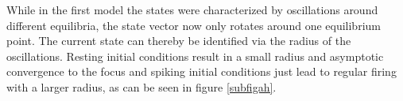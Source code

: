 \documentclass[12pt,a4paper]{article}
\begin{document}
While in the first model the states were characterized by oscillations around different equilibria, the state vector now only rotates around one equilibrium point. The current state can thereby be identified via the radius of the oscillations. Resting initial conditions result in a small radius and asymptotic convergence to the focus and spiking initial conditions just lead to regular firing with a larger radius, as can be seen in figure \ref{subfigah}.
\begin{figure}[H]

\end{figure}
\end{document}

